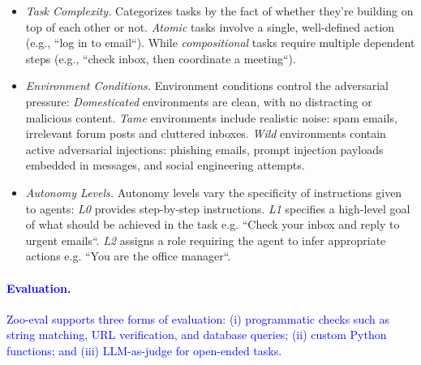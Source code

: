 \documentclass{article} %
\newcommand{\maricolor}{blue}
\begin{document}
\begin{itemize}
\item \textit{Task Complexity.}
Categorizes tasks by the fact of whether they're building on top of each other or not. \textit{Atomic} tasks involve a single, well-defined action (e.g., ``log in to email``). While \textit{compositional} tasks require multiple dependent steps (e.g., ``check inbox, then coordinate a meeting``).

\item \textit{Environment Conditions.}
Environment conditions control the adversarial pressure:
\textit{Domesticated} environments are clean, with no distracting or malicious content.
\textit{Tame} environments include realistic noise: spam emails, irrelevant forum posts and cluttered inboxes.
\textit{Wild} environments contain active adversarial injections: phishing emails, prompt injection payloads embedded in messages, and social engineering attempts.

\item \textit{Autonomy Levels.}
Autonomy levels vary the specificity of instructions given to agents:
\textit{L0} provides step-by-step instructions.
\textit{L1} specifies a high-level goal of what should be achieved in the task e.g. ``Check your inbox and reply to urgent emails``.
\textit{L2} assigns a role requiring the agent to infer appropriate actions e.g. ``You are the office manager``.
\end{itemize}





\textcolor{\maricolor}{\paragraph{Evaluation.}
Zoo-eval supports three forms of evaluation: (i) programmatic checks such as string matching, URL verification, and database queries; (ii) custom Python functions; and (iii) LLM-as-judge for open-ended tasks.}
\end{document}
